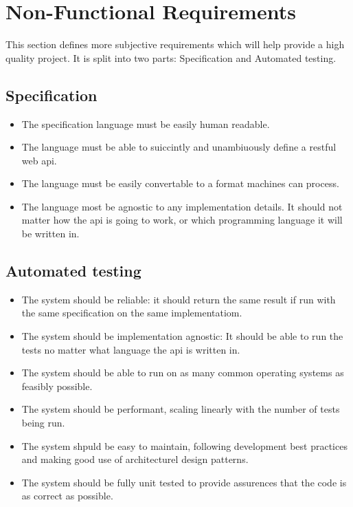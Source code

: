 \section{Non-Functional Requirements}

This section defines more subjective requirements which will help provide a high quality project. It is split into two parts: Specification and Automated testing.

\subsection{Specification}
\begin{itemize}
\item The specification language must be easily human readable.
\item The language must be able to suiccintly and unambiuously define a restful web api.
\item The language must be easily convertable to a format machines can process.
\item The language most be agnostic to any implementation details. It should not matter how the api is going to work, or which programming language it will be written in.
\end{itemize}

\subsection{Automated testing}
\begin{itemize}
\item The system should be reliable: it should return the same result if run with the same specification on the same implementatiom.
\item The system should be implementation agnostic: It should be able to run the tests no matter what language the api is written in.
\item The system should be able to run on as many common operating systems as feasibly possible.
\item The system should be performant, scaling linearly with the number of tests being run.
\item The system shpuld be easy to maintain, following development best practices and making good use of architecturel design patterns.
\item The system should be fully unit tested to provide assurences that the code is as correct as possible.
\end{itemize}